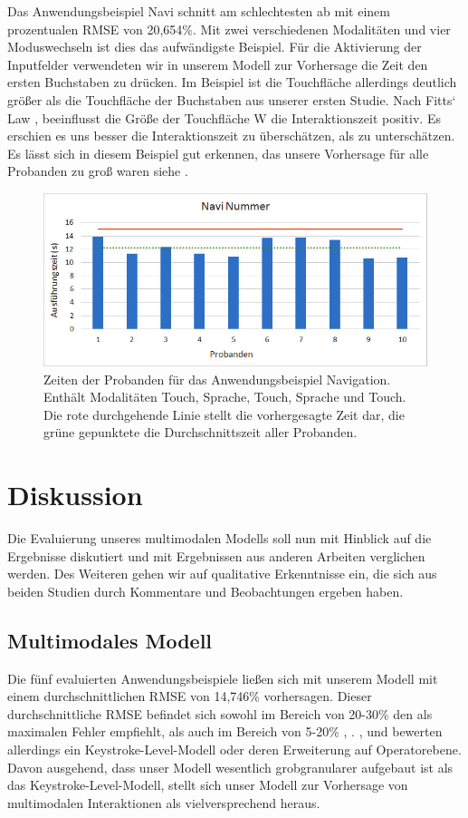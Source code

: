 Das Anwendungsbeispiel Navi schnitt am schlechtesten ab mit einem prozentualen RMSE von 20,654\%. Mit zwei verschiedenen Modalitäten und vier Moduswechseln ist dies das aufwändigste Beispiel. Für die Aktivierung der Inputfelder verwendeten wir in unserem Modell zur Vorhersage die Zeit den ersten Buchstaben zu drücken. Im Beispiel ist die Touchfläche allerdings deutlich größer als die Touchfläche der Buchstaben aus unserer ersten Studie. Nach Fitts` Law \citep{fitts1954information}, \citep{sasangohar2009evaluation}
beeinflusst die Größe der Touchfläche W die Interaktionszeit positiv. Es erschien es uns besser die Interaktionszeit zu überschätzen, als zu unterschätzen. Es lässt sich in diesem Beispiel gut erkennen, das unsere Vorhersage für alle Probanden zu groß waren siehe .
\begin{figure}
	\centering
		\includegraphics[width=1\textwidth]{img/Navi_Times.jpg}
	\caption[Zeiten der Probanden für das Anwendungsbeispiel Navigation.]{Zeiten der Probanden für das Anwendungsbeispiel Navigation. Enthält Modalitäten Touch, Sprache, Touch, Sprache und Touch. Die rote durchgehende Linie stellt die vorhergesagte Zeit dar, die grüne gepunktete die Durchschnittszeit aller Probanden.}
	\label{fig:Navi_Times}
\end{figure}
\section[Diskussion]{Diskussion}
Die Evaluierung unseres multimodalen Modells soll nun mit Hinblick auf die Ergebnisse diskutiert und mit Ergebnissen aus anderen Arbeiten verglichen werden. Des Weiteren gehen wir auf qualitative Erkenntnisse ein, die sich aus beiden Studien durch Kommentare und Beobachtungen ergeben haben.

\subsection[Modell]{Multimodales Modell}
Die fünf evaluierten Anwendungsbeispiele ließen sich mit unserem Modell mit einem durchschnittlichen RMSE von 14,746\% vorhersagen. Dieser durchschnittliche RMSE befindet sich sowohl im Bereich von 20-30\% den \citet{Card_1980} als maximalen Fehler empfiehlt, als auch im Bereich von 5-20\% \citep{Luo_2005}, \citep{Teo:2006}. \citet{Card_1980}, \citet{Luo_2005} und \citet{Teo:2006} bewerten allerdings ein Keystroke-Level-Modell oder deren Erweiterung auf Operatorebene. Davon ausgehend, dass unser Modell wesentlich grobgranularer aufgebaut ist als das Keystroke-Level-Modell, stellt sich unser Modell zur Vorhersage von multimodalen Interaktionen als vielversprechend heraus. 

